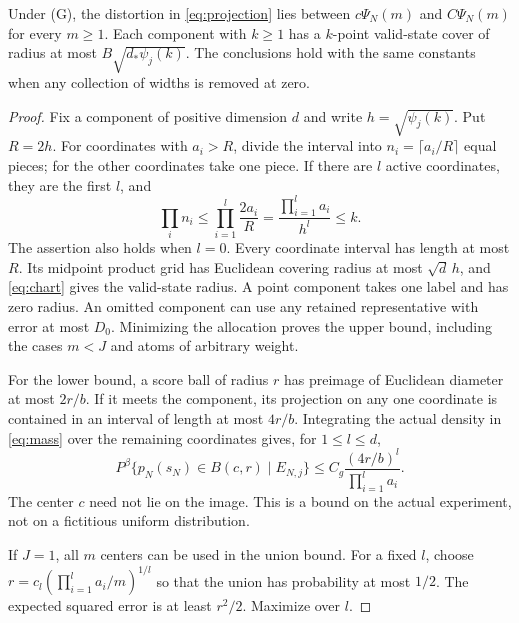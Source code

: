 \begin{lemma}\label{lem:geometry}
Under \textup{(G)}, the distortion in \eqref{eq:projection} lies between $c\Psi_N(m)$ and $C\Psi_N(m)$ for every $m\ge1$. Each component with $k\ge1$ has a $k$-point valid-state cover of radius at most $B\sqrt{d_*\psi_j(k)}$. The conclusions hold with the same constants when any collection of widths is removed at zero.
\end{lemma}
\begin{proof}
Fix a component of positive dimension $d$ and write
$h=\sqrt{\psi_j(k)}$. Put $R=2h$. For coordinates with $a_i>R$, divide the interval into $n_i=\lceil a_i/R\rceil$ equal pieces; for the other coordinates take one piece. If there are $l$ active coordinates, they are the first $l$, and
\[
 \prod_i n_i\le\prod_{i=1}^l\frac{2a_i}{R}
 =\frac{\prod_{i=1}^la_i}{h^l}\le k.
\]
The assertion also holds when $l=0$. Every coordinate interval has length at most $R$. Its midpoint product grid has Euclidean covering radius at most $\sqrt d\,h$, and \eqref{eq:chart} gives the valid-state radius. A point component takes one label and has zero radius. An omitted component can use any retained representative with error at most $D_0$. Minimizing the allocation proves the upper bound, including the cases $m<J$ and atoms of arbitrary weight.

For the lower bound, a score ball of radius $r$ has preimage of Euclidean diameter at most $2r/b$. If it meets the component, its projection on any one coordinate is contained in an interval of length at most $4r/b$. Integrating the actual density in \eqref{eq:mass} over the remaining coordinates gives, for $1\le l\le d$,
\begin{equation}\label{eq:smallball}
 P^\beta\{p_N(s_N)\in B(c,r)\mid E_{N,j}\}
 \le C_g\frac{(4r/b)^l}{\prod_{i=1}^la_i}.
\end{equation}
The center $c$ need not lie on the image. This is a bound on the actual experiment, not on a fictitious uniform distribution.

If $J=1$, all $m$ centers can be used in the union bound. For a fixed $l$, choose $r=c_l(\prod_{i=1}^la_i/m)^{1/l}$ so that the union has probability at most $1/2$. The expected squared error is at least $r^2/2$. Maximize over $l$.


\end{proof}
